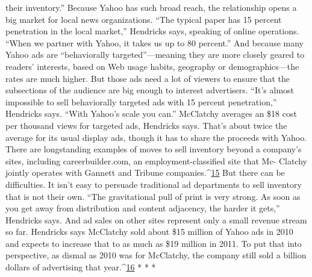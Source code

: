their inventory.''
Because Yahoo has such broad reach, the relationship opens a big market for local
news organizations. ``The typical paper has 15 percent penetration in the local
market,'' Hendricks says, speaking of online operations. ``When we partner with
Yahoo, it takes us up to 80 percent.'' And because many Yahoo ads are ``behaviorally
targeted''—meaning they are more closely geared to readers’ interests, based
on Web usage habits, geography or demographics—the rates are much higher.
But those ads need a lot of viewers to ensure that the subsections of the audience
are big enough to interest advertisers. ``It’s almost impossible to sell behaviorally
targeted ads with 15 percent penetration,'' Hendricks says. ``With Yahoo’s scale
you can.'' McClatchy averages an \$18 cost per thousand views for targeted ads,
Hendricks says. That’s about twice the average for its usual display ads, though it
has to share the proceeds with Yahoo.
There are longstanding examples of moves to sell inventory beyond a company’s
sites, including careerbuilder.com, an employment-classified site that Mc-
Clatchy jointly operates with Gannett and Tribune companies.^{\href{#endnotes-ch8}{15}} But there can
be difficulties. It isn’t easy to persuade traditional ad departments to sell inventory
that is not their own. ``The gravitational pull of print is very strong. As soon as
you get away from distribution and content adjacency, the harder it gets,'' Hendricks
says. And ad sales on other sites represent only a small revenue stream
so far. Hendricks says McClatchy sold about \$15 million of Yahoo ads in 2010
and expects to increase that to as much as \$19 million in 2011. To put that into
perspective, as dismal as 2010 was for McClatchy, the company still sold a billion
dollars of advertising that year.^{\href{#endnotes-ch8}{16}}
* * *

